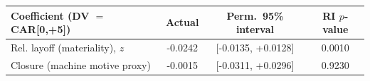\begin{tabular}{lccc}
\toprule
Coefficient (DV $=$ CAR[0,+5]) & Actual & Perm.\ 95\% interval & RI $p$-value \\
\midrule
Rel. layoff (materiality), $z$ & -0.0242 & [-0.0135, +0.0128] & 0.0010 \\
Closure (machine motive proxy) & -0.0015 & [-0.0311, +0.0296] & 0.9230 \\
\bottomrule
\end{tabular}